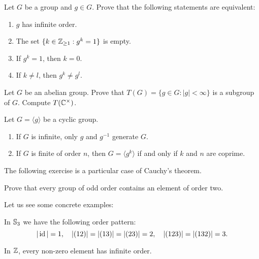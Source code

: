 \begin{exercise}
        Let $G$ be a group and $g\in G$. Prove that the following statements are equivalent:
        \begin{enumerate}
        \item $g$ has infinite order. 
        \item The set $\{k\in\mathbb{Z}_{\geq1}:g^k=1\}$ is empty.
        \item If $g^k=1$, then $k=0$.
        \item If $k\ne l$, then $g^k\ne g^l$.
        \end{enumerate}
\end{exercise}

\begin{exercise}
        Let $G$ be an abelian group. Prove that 
        $T(G)=\{g\in G:|g|<\infty\}$ is a subgroup of $G$. Compute $T(\mathbb{C}^\times)$.
\end{exercise}
                
\begin{exercise}
        Let $G=\langle g\rangle$ be a cyclic group. 
        \begin{enumerate}
                \item If $G$ is infinite, only $g$ and $g^{-1}$ generate $G$.
                \item If $G$ is finite of order $n$, then 
                        $G=\langle g^k\rangle$ if and only if $k$ and $n$ are coprime.
        \end{enumerate}
\end{exercise}
                
The following exercise is a particular 
case of Cauchy's theorem. 

\begin{exercise}
        \label{xca:orden2}
        Prove that every group of odd order contains
        an element of order two. 
\end{exercise}
                
Let us see some concrete examples: 

\begin{example}
        In $\mathbb{S}_3$ we have the following order pattern:
        \[
        |\operatorname{id}|=1,\quad
        |(12)|=|(13)|=|(23)|=2,\quad
        |(123)|=|(132)|=3.
        \]
\end{example}
                        
\begin{example}
        In $\mathbb{Z}$, every non-zero element has 
        infinite order. 
\end{example}
                        
